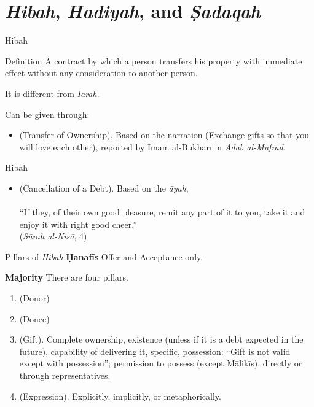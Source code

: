 \section{\textit{Hibah}, \textit{Hadiyah}, and \textit{Ṣadaqah}}\label{hibah-hadiyah-and-ux1e63adaqah}

\begin{frame}{Hibah \hfill {}}

\begin{block}{Definition}
A contract by which a person transfers his property with immediate effect without any consideration to another person.
\end{block}
It is different from \textit{Iarah}.

Can be given through:
\begin{itemize}
\item {} (Transfer of Ownership). Based on the narration {} (Exchange gifts so that you will love each other), reported by Imam al-Bukhārī in \textit{Adab al-Mufrad}.
\end{itemize}
\end{frame}

\begin{frame}{Hibah \hfill {}}
\begin{itemize}
  \item {} (Cancellation of a Debt). Based on the \textit{āyah},\\{}\\
  “If they, of their own good pleasure, remit any part of it to you, take it and enjoy it with right good cheer.”\\\hfill(\textit{Sūrah al-Nisā}, 4)
\end{itemize}
\end{frame}

\begin{frame}{Pillars of \textit{Hibah} \hfill {}}
\textbf{Ḥanafīs} Offer and Acceptance only.

\textbf{Majority} There are four pillars.

\begin{enumerate}
  \item {} (Donor)
  \item (Donee) {}
  \item {} (Gift). Complete ownership, existence (unless if it is a debt expected in the future), capability of delivering it, specific, possession: “Gift is not valid except with possession”; permission to possess (except Mālikīs), directly or through representatives.
  \item {} (Expression). Explicitly, implicitly, or metaphorically.
\end{enumerate}
\end{frame}

